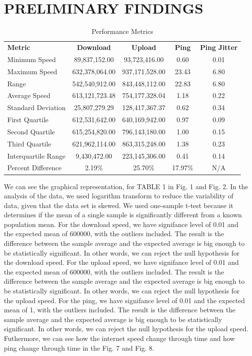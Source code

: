 \documentclass[conference]{IEEEtran}
\begin{document}
\section{PRELIMINARY FINDINGS}
\begin{table}[htbp]
    \centering
    \caption{Performance Metrics}
    \begin{tabular}{lcccc}
        \textbf{Metric} & \textbf{Download} & \textbf{Upload} & \textbf{Ping} & \textbf{Ping Jitter} \\
        Minimum Speed & 89,837,152.00 & 93,723,416.00 & 0.60 & 0.01 \\
        Maximum Speed & 632,378,064.00 & 937,171,528.00 & 23.43 & 6.80 \\
        Range & 542,540,912.00 & 843,448,112.00 & 22.83 & 6.80 \\
        Average Speed & 613,121,723.48 & 754,177,328.04 & 1.18 & 0.22 \\
        Standard Deviation & 25,807,279.29 & 128,417,367.37 & 0.62 & 0.34 \\
        First Quartile & 612,531,642.00 & 640,169,942.00 & 0.97 & 0.09 \\
        Second Quartile & 615,254,820.00 & 796,143,180.00 & 1.00 & 0.15 \\
        Third Quartile & 621,962,114.00 & 863,315,248.00 & 1.38 & 0.23 \\
        Interquartile Range & 9,430,472.00 & 223,145,306.00 & 0.41 & 0.14 \\
        Percent Difference & 2.19\% & 25.70\% & 17.97\% & N/A \\
    \end{tabular}
    \label{tab:performance}
\end{table}
We can see the graphical representation, for TABLE 1 in Fig. 1 and Fig. 2.
In the analysis of the data, we used logarithm transform to reduce the variability of data, given that the data set is skewed.
We used one-sample t-test because it determines if the mean of a single sample is significantly different from a known population mean.
For the download speed, we have signifance level of 0.01 and the expected mean of 600000, with the outliers included. 
The result is the difference between the sample average and the expected average is big enough to be statistically significant. 
In other words, we can reject the null hypothesis for the download speed.
For the upload speed, we have signifance level of 0.01 and the expected mean of 600000, with the outliers included. 
The result is the difference between the sample average and the expected average is big enough to be statistically significant. 
In other words, we can reject the null hypothesis for the upload speed.
For the ping, we have signifance level of 0.01 and the expected mean of 1, with the outliers included. 
The result is the difference between the sample average and the expected average is big enough to be statistically significant. 
In other words, we can reject the null hypothesis for the upload speed.
Futhermore, we can see how the internet speed change through time and how ping change through time in the Fig. 7 and Fig. 8.
\end{document}
